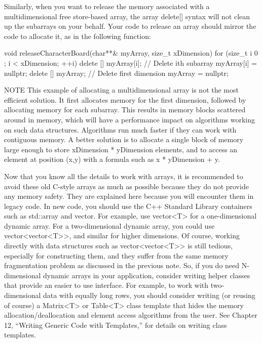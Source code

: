 Similarly, when you want to release the memory associated with a multidimensional free store-based array, the array delete[] syntax will not clean up the subarrays on your behalf. Your code to release an array should mirror the code to allocate it, as in the following function:

\begin{cpp}
void releaseCharacterBoard(char**& myArray, size_t xDimension)
{
    for (size_t i { 0 }; i < xDimension; ++i) {
        delete [] myArray[i]; // Delete ith subarray
        myArray[i] = nullptr;
    }
    delete [] myArray; // Delete first dimension
    myArray = nullptr;
}
\end{cpp}

\begin{myNotic}{NOTE}
This example of allocating a multidimensional array is not the most efficient solution. It first allocates memory for the first dimension, followed by allocating memory for each subarray. This results in memory blocks scattered around in memory, which will have a performance impact on algorithms working on such data structures. Algorithms run much faster if they can work with contiguous memory. A better solution is to allocate a single block of memory large enough to store xDimension * yDimension elements, and to access an element at position (x,y) with a formula such as x * yDimension + y.
\end{myNotic}

Now that you know all the details to work with arrays, it is recommended to avoid these old C-style arrays as much as possible because they do not provide any memory safety. They are explained here because you will encounter them in legacy code. In new code, you should use the C++ Standard Library containers such as std::array and vector. For example, use vector<T> for a one-dimensional dynamic array. For a two-dimensional dynamic array, you could use vector<vector<T>{}>, and similar for higher dimensions. Of course, working directly with data structures such as vector<vector<T>{}> is still tedious, especially for constructing them, and they suffer from the same memory fragmentation problem as discussed in the previous note. So, if you do need N-dimensional dynamic arrays in your application, consider writing helper classes that provide an easier to use interface. For example, to work with two-dimensional data with equally long rows, you should consider writing (or reusing of course) a Matrix<T> or Table<T> class template that hides the memory allocation/deallocation and element access algorithms from the user. See Chapter 12, “Writing Generic Code with Templates,” for details on writing class templates.

